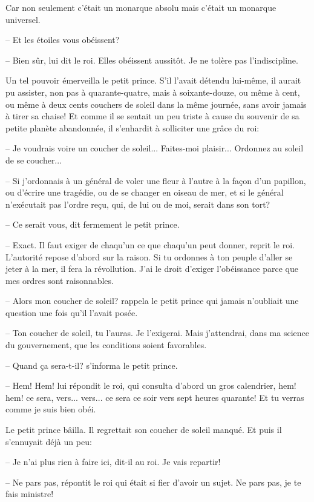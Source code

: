 \documentclass[a4paper]{report}
\begin{document}
Car non seulement c'était un monarque absolu mais c'était un monarque universel.

-- Et les étoiles vous obéissent?

-- Bien sûr, lui dit le roi. Elles obéissent aussitôt. Je ne tolère pas l'indiscipline.

Un tel pouvoir émerveilla le petit prince. S'il l'avait détendu lui-même, il aurait pu assister, non pas à quarante-quatre, mais à soixante-douze, ou même à cent, ou même à deux cents couchers de soleil dans la même journée, sans avoir jamais à tirer sa chaise! Et comme il se sentait un peu triste à cause du souvenir de sa petite planète abandonnée, il s'enhardit à solliciter une grâce du roi:

-- Je voudrais voire un coucher de soleil... Faites-moi plaisir... Ordonnez au soleil de se coucher...

-- Si j'ordonnais à un général de voler une fleur à l'autre à la façon d'un papillon, ou d'écrire une tragédie, ou de se changer en oiseau de mer, et si le général n'exécutait pas l'ordre reçu, qui, de lui ou de moi, serait dans son tort?

-- Ce serait vous, dit fermement le petit prince.

-- Exact. Il faut exiger de chaqu'un ce que chaqu'un peut donner, reprit le roi. L'autorité repose d'abord sur la raison. Si tu ordonnes à ton peuple d'aller se jeter à la mer, il fera la révollution. J'ai le droit d'exiger l'obéissance parce que mes ordres sont raisonnables.

-- Alors mon coucher de soleil? rappela le petit prince qui jamais n'oubliait une question une fois qu'il l'avait posée.

-- Ton coucher de soleil, tu l'auras. Je l'exigerai. Mais j'attendrai, dans ma science du gouvernement, que les conditions soient favorables.

-- Quand ça sera-t-il? s'informa le petit prince.

-- Hem! Hem! lui répondit le roi, qui consulta d'abord un gros calendrier, hem! hem! ce sera, vers... vers... ce sera ce soir vers sept heures quarante! Et tu verras comme je suis bien obéi.

Le petit prince bâilla. Il regrettait son coucher de soleil manqué. Et puis il s'ennuyait déjà un peu:

-- Je n'ai plus rien à faire ici, dit-il au roi. Je vais repartir!

-- Ne pars pas, répontit le roi qui était si fier d'avoir un sujet. Ne pars pas, je te fais ministre!
\end{document}
